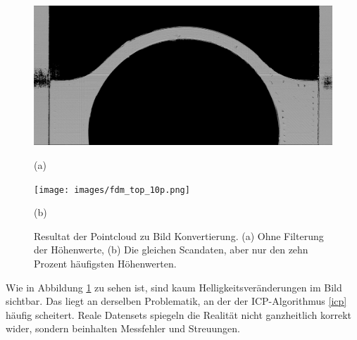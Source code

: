 \begin{figure}[H]
    \begin{minipage}{0.49\textwidth}
        \centering
        \includegraphics[width=\textwidth]{images/fdm_top_100p.png} %
        \caption*{(a)} 
    \end{minipage}\hfill
    \begin{minipage}{0.49\textwidth}
        \centering
        \texttt{[image: images/fdm\_top\_10p.png]} %
        \caption*{(b)}
    \end{minipage}\hfill
    \caption{Resultat der Pointcloud zu Bild Konvertierung. (a) Ohne Filterung der Höhenwerte, (b) Die gleichen 
            Scandaten, aber nur den zehn Prozent häufigsten Höhenwerten.}
        \label{fig:image_from_pc}
\end{figure}

Wie in Abbildung \ref{fig:image_from_pc} zu sehen ist, sind kaum Helligkeitsveränderungen
im Bild sichtbar. Das liegt an derselben Problematik, an der der ICP-Algorithmus \ref{icp} häufig
scheitert. Reale Datensets spiegeln die Realität nicht ganzheitlich korrekt wider, sondern
beinhalten Messfehler und Streuungen.

